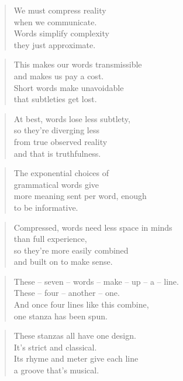 \documentclass[14pt,a4paper]{article}
\begin{document}
\begin{verse}
We must compress reality\\
when we communicate.\\
Words simplify complexity\\
they just approximate.
\end{verse}

\begin{verse}
This makes our words transmissible\\
and makes us pay a cost.\\
Short words make unavoidable\\
that subtleties get lost.
\end{verse}

\begin{verse}
At best, words lose less subtlety,\\
so they’re diverging less\\
from true observed reality\\
and that is truthfulness.
\end{verse}

\begin{verse}
The exponential choices of\\
grammatical words give\\
more meaning sent per word, enough\\
to be informative.
\end{verse}

\begin{verse}
Compressed, words need less space in minds\\
than full experience,\\
so they’re more easily combined\\
and built on to make sense.
\end{verse}

\begin{verse}
These – seven – words – make – up – a – line.\\
These – four – another – one.\\
And once four lines like this combine,\\
one stanza has been spun.
\end{verse}

\begin{verse}
These stanzas all have one design.\\
It’s strict and classical.\\
Its rhyme and meter give each line\\
a groove that’s musical.
\end{verse}
\end{document}

